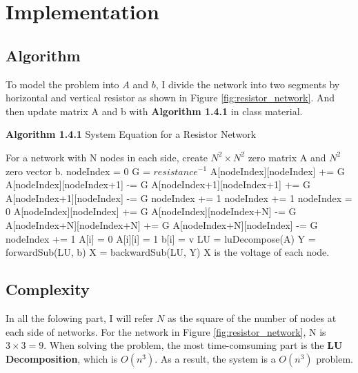 \documentclass{article}
\begin{document}
\section{Implementation}
\subsection{Algorithm}
To model the problem into $A$ and $b$, I divide the network into two segments by horizontal and vertical resistor as shown in
Figure \ref{fig:resistor_network}. And then update matrix A and b with \textbf{Algorithm 1.4.1} in class material.
\begin{algorithm}[htb]
    \caption*{\textbf{Algorithm 1.4.1} System Equation for a Resistor Network}
    \label{algo:resistor_network}
    \begin{algorithmic}
        \State For a network with N nodes in each side, create $N^2 \times N^2$ zero matrix A and $N^2$ zero vector b.
        \State nodeIndex = 0
        \State G = $resistance^{-1}$
                \State A[nodeIndex][nodeIndex] += G
                \State A[nodeIndex][nodeIndex+1] -= G
                \State A[nodeIndex+1][nodeIndex+1] += G
                \State A[nodeIndex+1][nodeIndex] -= G
                \State nodeIndex += 1
            \EndFor
            \State nodeIndex += 1
        \EndFor
        \State nodeIndex = 0
                \State A[nodeIndex][nodeIndex] += G
                \State A[nodeIndex][nodeIndex+N] -= G
                \State A[nodeIndex+N][nodeIndex+N] += G
                \State A[nodeIndex+N][nodeIndex] -= G
                \State nodeIndex += 1
            \EndFor
        \EndFor
            \State A[i] = 0
            \State A[i][i] = 1
            \State b[i] = v
        \EndFor
        \State LU = luDecompose(A)
        \State Y = forwardSub(LU, b)
        \State X = backwardSub(LU, Y)
        \State X is the voltage of each node.
    \end{algorithmic}
\end{algorithm}

\subsection{Complexity}
\label{sec:complexity}
In all the folowing part, I will refer $N$ as the square of the number of nodes at each side of networks. For the network in 
Figure \ref{fig:resistor_network}, N is $3 \times 3 = 9$. \newline
When solving the problem, the most time-comsuming part is the \textbf{LU Decomposition}, which is $O(n^3)$. As a result, the
system is a {\boldmath$O(n^3)$} problem.
\end{document}

